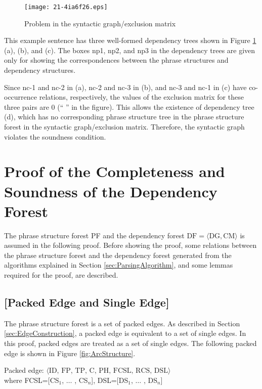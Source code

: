 \documentclass[english]{jnlp_1.4_rep}
\theoremstyle{break}
\theoremstyle{plain}
\theoremstyle{plain}
\begin{document}
\begin{figure}[b]
 \begin{center}
\texttt{[image: 21-4ia6f26.eps]}
 \end{center}
\caption{Problem in the syntactic graph/exclusion matrix}
\label{fig:SynGraphBadExample}
\end{figure}

This example sentence has three well-formed dependency trees shown in
Figure \ref{fig:SynGraphBadExample} (a), (b), and (c). The boxes np1, np2,
and np3 in the dependency trees are given only for showing the
correspondences between the phrase structures and dependency structures.

Since nc-1 and nc-2 in (a), nc-2 and nc-3 in (b), and nc-3 and nc-1 in
(c) have co-occurrence relations, respectively, the values of the
exclusion matrix for these three pairs are 0 (`` '' in the
figure). This allows the existence of dependency tree (d), which
has no corresponding phrase structure tree in the phrase structure
forest in the syntactic graph/exclusion matrix. Therefore, the
syntactic graph violates the soundness condition.


\section{Proof of the Completeness and Soundness of the Dependency Forest}

The phrase structure forest PF and the dependency forest
$\mathrm{DF}=\langle \mathrm{DG}, \mathrm{CM}\rangle$ is assumed in the following proof. Before showing the
proof, some relations between the phrase structure forest and the
dependency forest generated from the algorithms explained in Section
\ref{sec:ParsingAlgorithm}, and some lemmas required for the proof, are
described.


\subsection*{[Packed Edge and Single Edge]}

The phrase structure forest is a set of packed edges. As described in
Section \ref{sec:EdgeConstruction}, a packed edge is equivalent to a
set of single edges. In this proof, packed edges are treated as a set
of single edges. The following packed edge is shown in
Figure \ref{fig:ArcStructure}.

Packed edge: $\langle\text{ID, FP, TP, C, PH, FCSL, RCS, DSL}\rangle$ \\
\hspace{7em}where FCSL=[CS$_1$, ${\ldots}$ , CS$_n$], DSL=[DS$_1$, ${\ldots}$ , DS$_n$]
\end{document}
